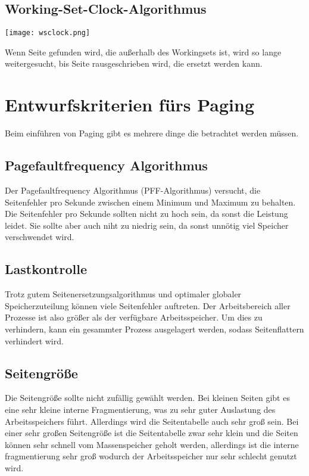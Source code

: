 \subsection{Working-Set-Clock-Algorithmus}

\texttt{[image: wsclock.png]}

Wenn Seite gefunden wird, die außerhalb des Workingsets ist, wird so lange
weitergesucht, bis Seite rausgeschrieben wird, die ersetzt werden kann.

\section{Entwurfskriterien fürs Paging}

Beim einführen von Paging gibt es mehrere dinge die betrachtet werden müssen.

\subsection{Pagefaultfrequency Algorithmus}

Der Pagefaultfrequency Algorithmus (PFF-Algorithmus) versucht, die Seitenfehler
pro Sekunde zwischen einem Minimum und Maximum zu behalten. Die Seitenfehler
pro Sekunde sollten nicht zu hoch sein, da sonst die Leistung leidet. Sie
sollte aber auch niht zu niedrig sein, da sonst unnötig viel Speicher
verschwendet wird.

\subsection{Lastkontrolle}

Trotz gutem Seitenersetzungsalgorithmus und optimaler globaler
Speicherzuteilung können viele Seitenfehler auftreten. Der Arbeitsbereich aller
Prozesse ist also größer als der verfügbare Arbeitsspeicher. Um dies zu
verhindern, kann ein gesammter Prozess ausgelagert werden, sodass
Seitenflattern verhindert wird.

\subsection{Seitengröße}

Die Seitengröße sollte nicht zufällig gewählt werden. Bei kleinen Seiten gibt
es eine sehr kleine interne Fragmentierung, was zu sehr guter Auslastung des
Arbeitsspeichers führt. Allerdings wird die Seitentabelle auch sehr groß sein.
Bei einer sehr großen Seitengröße ist die Seitentabelle zwar sehr klein und die
Seiten können sehr schnell vom Massenspeicher geholt werden, allerdings ist die
interne fragmentierung sehr groß wodurch der Arbeitsspeicher nur sehr schlecht
genutzt wird.

